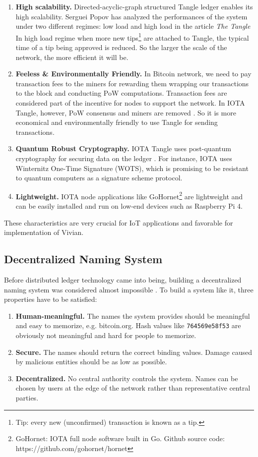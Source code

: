\begin{enumerate}
    \item \textbf{High scalability.} Directed-acyclic-graph structured Tangle ledger enables its high scalability. Serguei Popov has analyzed the performances of the system under two different regimes: low load and high load in the article \textit{The Tangle} \cite{popov2015tangle} In high load regime when more new tips\footnote{Tip: every new (unconfirmed) transaction is known as a tip.} are attached to Tangle, the typical time of a tip being approved is reduced.
          So the larger the scale of the network, the more efficient it will be.
    \item \textbf{Feeless \& Environmentally Friendly.} In Bitcoin network, we need to pay transaction fees to the miners for rewarding them wrapping our transactions to the block and conducting PoW computations. Transaction fees are considered part of the incentive for nodes to support the network. In IOTA Tangle, however, PoW consensus and miners are removed \cite{popov2019iota}. So it is more economical and environmentally friendly to use Tangle for sending transactions.
    \item \textbf{Quantum Robust Cryptography.} IOTA Tangle uses post-quantum cryptography for securing data on the ledger \cite{tennant2017improving}. For instance, IOTA uses Winternitz One-Time Signature (WOTS), which is promising to be resistant to quantum computers \cite{buchmann2008post} as a signature scheme protocol.
    \item \textbf{Lightweight.} IOTA node applications like GoHornet\footnote{GoHornet: IOTA full node software built in Go. Github source code: https://github.com/gohornet/hornet} are lightweight and can be easily installed and run on low-end devices such as Raspberry Pi 4.
\end{enumerate}

These characteristics are very crucial for IoT applications and favorable for implementation of Vivian.


\subsection{Decentralized Naming System}
Before distributed ledger technology came into being, building a decentralized naming system was considered almost impossible \cite{swartz_2011}. To build a system like it, three properties have to be satisfied:

\begin{enumerate}
    \item \textbf{Human-meaningful.} The names the system provides should be meaningful and easy to memorize, e.g. bitcoin.org. Hash values like \texttt{764569e58f53} are obviously not meaningful and hard for people to memorize.
    \item \textbf{Secure.} The names should return the correct binding values. Damage caused by malicious entities should be as low  as possible.
    \item \textbf{Decentralized.} No central authority controls the system. Names can be chosen by users at the edge of the network rather than representative central parties.
\end{enumerate}

